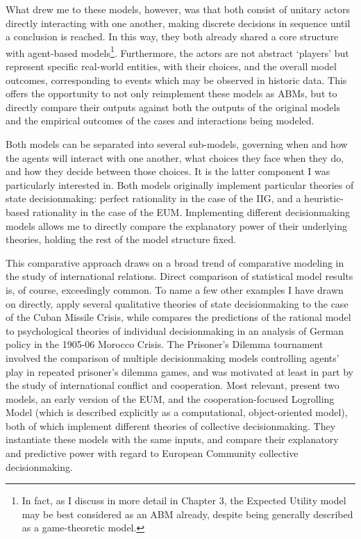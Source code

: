 What drew me to these models, however, was that both consist of unitary actors directly interacting with one another, making discrete decisions in sequence until a conclusion is reached. In this way, they both already shared a core structure with agent-based models\footnote{In fact, as I discuss in more detail in Chapter 3, the Expected Utility model may be best considered as an ABM already, despite being generally described as a game-theoretic model.}. Furthermore, the actors are not abstract `players' but represent specific real-world entities, with their choices, and the overall model outcomes, corresponding to events which may be observed in historic data. This offers the opportunity to not only reimplement these models as ABMs, but to directly compare their outputs against both the outputs of the original models and the empirical outcomes of the cases and interactions being modeled.

Both models can be separated into several sub-models, governing when and how the agents will interact with one another, what choices they face when they do, and how they decide between those choices. It is the latter component I was particularly interested in. Both models originally implement particular theories of state decisionmaking: perfect rationality in the case of the IIG, and a heuristic-based rationality in the case of the EUM. Implementing different decisionmaking models allows me to directly compare the explanatory power of their underlying theories, holding the rest of the model structure fixed.

This comparative approach draws on a broad trend of comparative modeling in the study of international relations. Direct comparison of statistical model results is, of course, exceedingly common. To name a few other examples I have drawn on directly, \citet{allison_1999} apply several qualitative theories of state decisionmaking to the case of the Cuban Missile Crisis, while \citet{kaufmann_1994} compares the predictions of the rational model to psychological theories of individual decisionmaking in an analysis of German policy in the 1905-06 Morocco Crisis. The \citet{axelrod_1980} Prisoner's Dilemma tournament involved the comparison of multiple decisionmaking models controlling agents' play in repeated prisoner's dilemma games, and was motivated at least in part by the study of international conflict and cooperation. Most relevant, \citet{stokman_1994b} present two models, an early version of the EUM, and the \citet{stokman_1994} cooperation-focused Logrolling Model (which is described explicitly as a computational, object-oriented model), both of which implement different theories of collective decisionmaking. They instantiate these models with the same inputs, and compare their explanatory and predictive power with regard to European Community collective decisionmaking.

